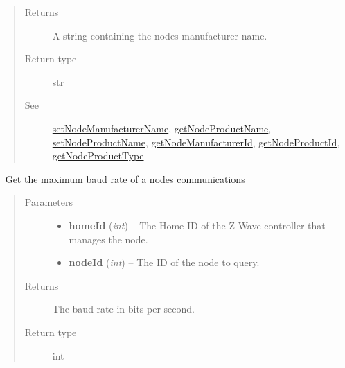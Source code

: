 \documentclass[letterpaper,10pt,english]{sphinxmanual}
\begin{document}
\begin{fulllineitems}
\begin{fulllineitems}
\begin{quote}
\begin{description}
\item[{Returns}] \leavevmode
A string containing the nodes manufacturer name.

\item[{Return type}] \leavevmode
str

\item[{See}] \leavevmode
{\hyperref[libopenzwave:setnodemanufacturername]{setNodeManufacturerName}}, {\hyperref[libopenzwave:getnodeproductname]{getNodeProductName}}, {\hyperref[libopenzwave:setnodeproductname]{setNodeProductName}},     {\hyperref[libopenzwave:getnodemanufacturerid]{getNodeManufacturerId}}, {\hyperref[libopenzwave:getnodeproductid]{getNodeProductId}}, {\hyperref[libopenzwave:getnodeproducttype]{getNodeProductType}}

\end{description}\end{quote}

\end{fulllineitems}


\begin{fulllineitems}
\label{libopenzwave:libopenzwave.PyManager.getNodeMaxBaudRate}~\label{libopenzwave:getnodemaxbaudrate}
Get the maximum baud rate of a nodes communications
\begin{quote}\begin{description}
\item[{Parameters}] \leavevmode\begin{itemize}
\item {} 
\textbf{homeId} (\emph{int}) -- The Home ID of the Z-Wave controller that manages the node.

\item {} 
\textbf{nodeId} (\emph{int}) -- The ID of the node to query.

\end{itemize}

\item[{Returns}] \leavevmode
The baud rate in bits per second.

\item[{Return type}] \leavevmode
int

\end{description}\end{quote}

\end{fulllineitems}


\end{fulllineitems}
\end{document}
